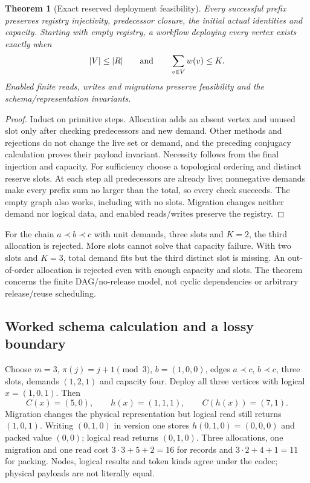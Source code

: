 \documentclass[11pt,a4paper]{article}
\newtheorem{theorem}{Theorem}[section]
\theoremstyle{definition}
\begin{document}
\begin{theorem}[Exact reserved deployment feasibility]\label{thm:B-capacity}
Every successful prefix preserves registry injectivity, predecessor closure,
the initial actual identities and capacity. Starting with empty registry,
a workflow deploying every vertex exists exactly when
\[
|V|\leq|R|\qquad\hbox{and}\qquad\sum_{v\in V}w(v)\leq K.
\]
Enabled finite reads, writes and migrations preserve feasibility and the
schema/representation invariants.
\end{theorem}
\begin{proof}
Induct on primitive steps. Allocation adds an absent vertex and unused
slot only after checking predecessors and new demand. Other methods and
rejections do not change the live set or demand, and the preceding
conjugacy calculation proves their payload invariant. Necessity follows
from the final injection and capacity. For sufficiency choose a
topological ordering and distinct reserve slots. At each step all
predecessors are already live; nonnegative demands make every prefix
sum no larger than the total, so every check succeeds. The empty graph
also works, including with no slots. Migration changes neither demand
nor logical data, and enabled reads/writes preserve the registry.
\end{proof}
For the chain $a\prec b\prec c$ with unit demands, three slots and
$K=2$, the third allocation is rejected. More slots cannot solve that
capacity failure. With two slots and $K=3$, total demand fits but the
third distinct slot is missing. An out-of-order allocation is rejected
even with enough capacity and slots. The theorem concerns the finite
DAG/no-release model, not cyclic dependencies or arbitrary release/reuse
scheduling.

\subsection{Worked schema calculation and a lossy boundary}
Choose $m=3$, $\pi(j)=j+1\pmod3$, $b=(1,0,0)$, edges
$a\prec c$, $b\prec c$, three slots, demands $(1,2,1)$ and capacity
four. Deploy all three vertices with logical $x=(1,0,1)$.
Then
\[
C(x)=(5,0),\qquad h(x)=(1,1,1),\qquad C(h(x))=(7,1).
\]
Migration changes the physical representation but logical read still
returns $(1,0,1)$. Writing $(0,1,0)$ in version one stores
$h(0,1,0)=(0,0,0)$ and packed value $(0,0)$; logical read returns
$(0,1,0)$. Three allocations, one migration and one read cost
$3\cdot3+5+2=16$ for records and $3\cdot2+4+1=11$ for packing.
Nodes, logical results and token kinds agree under the codec; physical
payloads are not literally equal.
\end{document}
